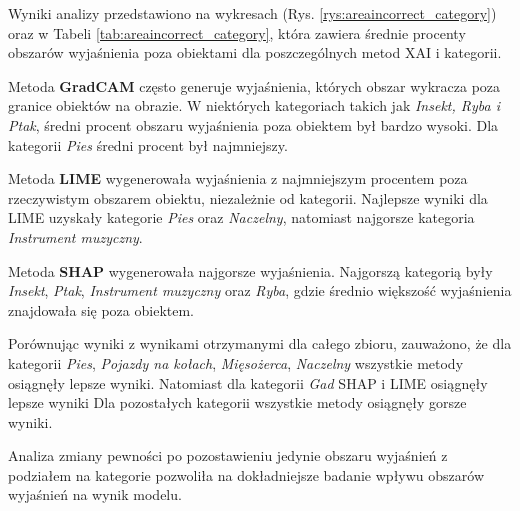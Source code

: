 Wyniki analizy  przedstawiono na wykresach (Rys. \ref{rys:areaincorrect_category}) oraz w Tabeli \ref{tab:areaincorrect_category}, która zawiera średnie procenty obszarów wyjaśnienia poza obiektami dla poszczególnych metod XAI i kategorii.

Metoda \textbf{GradCAM} często generuje wyjaśnienia, których obszar wykracza poza granice obiektów na obrazie.
W niektórych kategoriach takich jak \textit{Insekt, Ryba i Ptak}, średni procent obszaru wyjaśnienia poza obiektem był bardzo wysoki.
Dla kategorii \textit{Pies} średni procent był najmniejszy.

Metoda \textbf{LIME} wygenerowała wyjaśnienia z najmniejszym procentem poza rzeczywistym obszarem obiektu, niezależnie od kategorii.
Najlepsze wyniki dla LIME uzyskały kategorie \textit{Pies} oraz \textit{Naczelny}, natomiast najgorsze kategoria \textit{Instrument muzyczny}.

Metoda \textbf{SHAP} wygenerowała najgorsze wyjaśnienia.
Najgorszą kategorią były \textit{Insekt}, \textit{Ptak}, \textit{Instrument muzyczny} oraz \textit{Ryba}, gdzie średnio większość wyjaśnienia znajdowała się poza obiektem.

Porównując wyniki z wynikami otrzymanymi dla całego zbioru, zauważono, że dla kategorii \textit{Pies}, \textit{Pojazdy na kołach}, \textit{Mięsożerca}, \textit{Naczelny} wszystkie metody osiągnęły lepsze wyniki.
Natomiast dla kategorii \textit{Gad} SHAP i LIME osiągnęły lepsze wyniki
Dla pozostałych kategorii wszystkie metody osiągnęły gorsze wyniki.

\vspace{1cm}

Analiza zmiany pewności po pozostawieniu jedynie obszaru wyjaśnień z podziałem na kategorie pozwoliła na dokładniejsze badanie wpływu obszarów wyjaśnień na wynik modelu.

